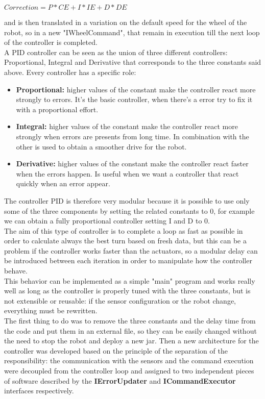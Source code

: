 \documentclass{llncs}
\begin{document}
\begin{center}
$ Correction = P*CE + I*IE + D*DE $\\
\end{center}
and is then translated in a variation on the default speed for the wheel of the robot, so in a new "IWheelCommand", that remain in execution till the next loop of the controller is completed.\\
A PID controller can be seen as the union of three different controllers: Proportional, Integral and Derivative that corresponds to the three constants said above. Every controller has a specific role:
\begin{itemize}
	\item \textbf{Proportional: } higher values of the constant make the controller react more strongly to errors. It's the basic controller, when there's a error try to fix it with a proportional effort.
	\item \textbf{Integral: } higher values of the constant make the controller react more strongly when errors are presents from long time. In combination with the other is used to obtain a smoother drive for the robot.
	\item \textbf{Derivative: } higher values of the constant make the controller react faster when the errors happen. Is useful when we want a controller that react quickly when an error appear. 
\end{itemize}
\noindent The controller PID is therefore very modular because it is possible to use only some of the three components by setting the related constants to 0, for example we can obtain a fully proportional controller setting I and D to 0.\\
The aim of this type of controller is to complete a loop as fast as possible in order to calculate always the best turn based on fresh data, but this can be a problem if the controller works faster than the actuators, so a modular delay can be introduced between each iteration in order to manipulate how the controller behave.\\
This behavior can be implemented as a simple "main" program and works really well as long as the controller is properly tuned with the three constants, but is not extensible or reusable: if the sensor configuration or the robot change, everything must be rewritten.\\
The first thing to do was to remove the three constants and the delay time from the code and put them in an external file, so they can be easily changed without the need to stop the robot and deploy a new jar. Then a new architecture for the controller was developed based on the principle of the separation of the responsibility: the communication with the sensors and the command execution were decoupled from the controller loop and assigned to two independent pieces of software described by the \textbf{IErrorUpdater} and \textbf{ICommandExecutor} interfaces respectively.
\begin{center}
\end{center}
\end{document}
